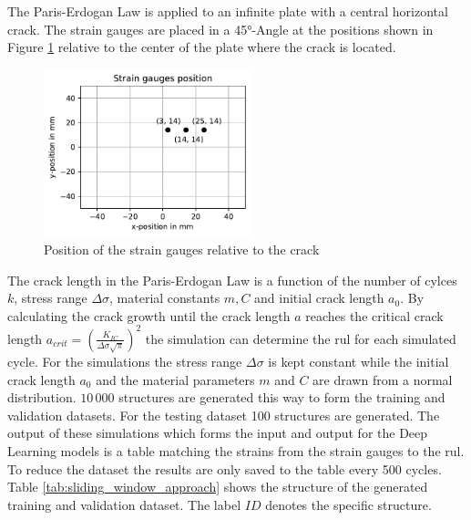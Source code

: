 \documentclass[conference]{IEEEtran}
\begin{document}
The Paris-Erdogan Law is applied to an infinite plate with a central horizontal crack. The strain gauges are placed in a 45°-Angle at the positions shown in Figure \ref{fig:strain_gauge_positions} relative to the center of the plate where the crack is located.

\begin{figure}[htp]
	\centering
	\includegraphics[width=6cm]{python/strain_gauges_position.pdf}
	\caption{Position of the strain gauges relative to the crack}
	\label{fig:strain_gauge_positions}
\end{figure}

The crack length in the Paris-Erdogan Law is a function of the number of cylces $k$, stress range $\Delta \sigma$, material constants $m, C$ and initial crack length $a_0$. By calculating the crack growth until the crack length $a$ reaches the critical crack length $a_{crit}=(\frac{K_{IC}}{\Delta \sigma \sqrt{\pi}})^2$ the simulation can determine the \gls{rul} for each simulated cycle. For the simulations the stress range $\Delta \sigma$ is kept constant while the initial crack length $a_0$ and the material parameters $m$ and $C$ are drawn from a normal distribution. $ 10\,000 $ structures are generated this way to form the training and validation datasets. For the testing dataset 100 structures are generated. The output of these simulations which forms the input and output for the Deep Learning models is a table matching the strains from the strain gauges to the \gls{rul}. To reduce the dataset the results are only saved to the table every 500 cycles. Table \ref{tab:sliding_window_approach} shows the structure of the generated training and validation dataset. The label $ ID $ denotes the specific structure.
\end{document}
